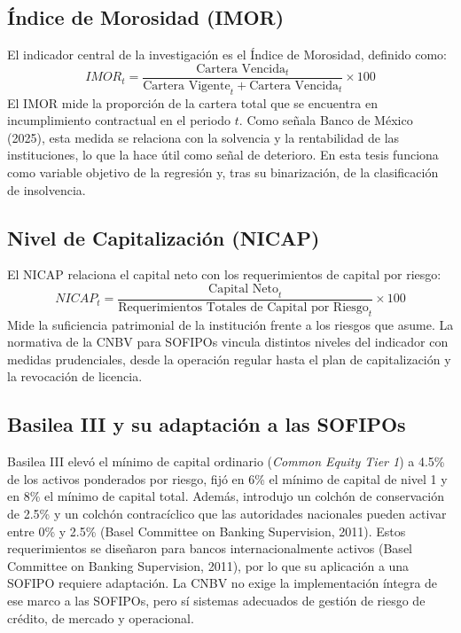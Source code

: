 \subsection{Índice de Morosidad (IMOR)}
El indicador central de la investigación es el Índice de Morosidad, definido como:
\begin{equation}
IMOR_t = \frac{\text{Cartera Vencida}_t}{\text{Cartera Vigente}_t + \text{Cartera Vencida}_t} \times 100
\label{eq:imor}
\end{equation}
El IMOR mide la proporción de la cartera total que se encuentra en incumplimiento contractual en el periodo $t$. Como señala Banco de México (2025), esta medida se relaciona con la solvencia y la rentabilidad de las instituciones, lo que la hace útil como señal de deterioro. En esta tesis funciona como variable objetivo de la regresión y, tras su binarización, de la clasificación de insolvencia.

\subsection{Nivel de Capitalización (NICAP)}
El NICAP relaciona el capital neto con los requerimientos de capital por riesgo:
\begin{equation}
NICAP_t = \frac{\text{Capital Neto}_t}{\text{Requerimientos Totales de Capital por Riesgo}_t} \times 100
\label{eq:nicap}
\end{equation}
Mide la suficiencia patrimonial de la institución frente a los riesgos que asume. La normativa de la CNBV para SOFIPOs vincula distintos niveles del indicador con medidas prudenciales, desde la operación regular hasta el plan de capitalización y la revocación de licencia.%

\subsection{Basilea III y su adaptación a las SOFIPOs}
Basilea III elevó el mínimo de capital ordinario (\textit{Common Equity Tier 1}) a 4.5\% de los activos ponderados por riesgo, fijó en 6\% el mínimo de capital de nivel 1 y en 8\% el mínimo de capital total. Además, introdujo un colchón de conservación de 2.5\% y un colchón contracíclico que las autoridades nacionales pueden activar entre 0\% y 2.5\% (Basel Committee on Banking Supervision, 2011). Estos requerimientos se diseñaron para bancos internacionalmente activos (Basel Committee on Banking Supervision, 2011), por lo que su aplicación a una SOFIPO requiere adaptación. La CNBV no exige la implementación íntegra de ese marco a las SOFIPOs, pero sí sistemas adecuados de gestión de riesgo de crédito, de mercado y operacional.%


